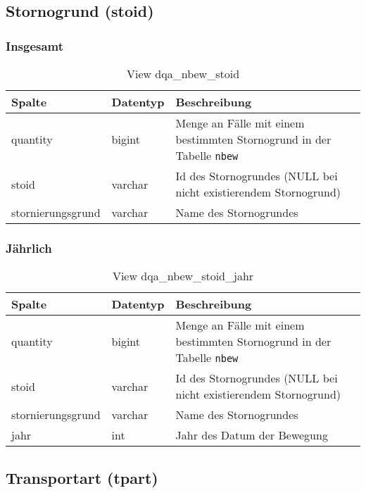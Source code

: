 \subsection{Stornogrund (stoid)} \label{subsec:bewStoid}

\subsubsection{Insgesamt} \label{subsubsec:bewStoidI}

\begin{table}[ht]
	\centering   
	\caption{View dqa\_nbew\_stoid}
	\label{tab:bewStoidI}
	\begin{tabular}{||l|l|p{10cm}||}   		
		\hline
		Spalte & Datentyp & Beschreibung \\ [0.5ex]
		\hline\hline
		quantity & bigint & Menge an Fälle mit einem bestimmten Stornogrund in der Tabelle \texttt{nbew} \\
		\hline
		stoid & varchar & Id des Stornogrundes (NULL bei nicht existierendem Stornogrund)\\
		\hline
		stornierungsgrund & varchar & Name des Stornogrundes \\
		\hline
	\end{tabular}
\end{table}

\subsubsection{Jährlich} \label{subsubsec:bewStoidJ}

\begin{table}[ht]
	\centering   
	\caption{View dqa\_nbew\_stoid\_jahr}
	\label{tab:bewStoidJ}
	\begin{tabular}{||l|l|p{10cm}||}   		
		\hline
		Spalte & Datentyp & Beschreibung \\ [0.5ex]
		\hline\hline
		quantity & bigint & Menge an Fälle mit einem bestimmten Stornogrund in der Tabelle \texttt{nbew}\\
		\hline
		stoid & varchar & Id des Stornogrundes (NULL bei nicht existierendem Stornogrund)\\
		\hline
		stornierungsgrund & varchar & Name des Stornogrundes \\
		\hline
		jahr & int &  Jahr des Datum der Bewegung \\
		\hline		
	\end{tabular}
\end{table}
\newpage
\subsection{Transportart (tpart)} \label{subsec:bewTpart}

